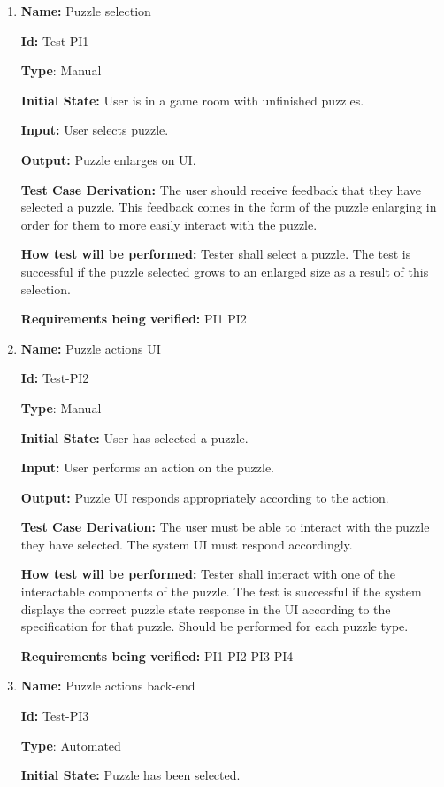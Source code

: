 \documentclass[12pt, titlepage]{article}
\begin{document}
\begin{enumerate}

\item{\textbf{Name:} Puzzle selection}

\textbf{Id:} Test-PI1

\textbf{Type}: Manual

\textbf{Initial State:} User is in a game room with unfinished puzzles.

\textbf{Input:} User selects puzzle.

\textbf{Output:} Puzzle enlarges on UI.

\textbf{Test Case Derivation:}
The user should receive feedback that they have selected a puzzle. This feedback comes in the form of the puzzle enlarging in order for them to more easily interact with the puzzle. 

\textbf{How test will be performed:}
Tester shall select a puzzle. The test is successful if the puzzle selected grows to an enlarged size as a result of this selection.

\textbf{Requirements being verified: } PI1 PI2

\item{\textbf{Name:} Puzzle actions UI}

\textbf{Id:} Test-PI2

\textbf{Type}: Manual

\textbf{Initial State:} User has selected a puzzle.

\textbf{Input:} User performs an action on the puzzle.

\textbf{Output:} Puzzle UI responds appropriately according to the action.

\textbf{Test Case Derivation:}
The user must be able to interact with the puzzle they have selected. The system UI must respond accordingly.

\textbf{How test will be performed:}
Tester shall interact with one of the interactable components of the puzzle. The test is successful if the system displays the correct puzzle state response in the UI according to the specification for that puzzle. Should be performed for each puzzle type.

\textbf{Requirements being verified: } PI1 PI2 PI3 PI4

\item{\textbf{Name:} Puzzle actions back-end}

\textbf{Id:} Test-PI3

\textbf{Type}: Automated

\textbf{Initial State:} Puzzle has been selected.


\end{enumerate}
\end{document}
